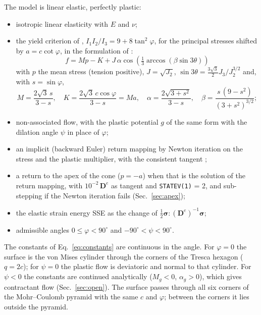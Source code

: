 \documentclass[11pt,a4paper]{article}
\begin{document}
The model is linear elastic, perfectly plastic:
\begin{itemize}
  \item isotropic linear elasticity with $E$ and $\nu$;
  \item the yield criterion of \citet{Matsuoka_1974}, $I_1 I_2 / I_3 = 9 + 8\tan^2\varphi$, for the
        principal stresses shifted by $a = c\cot\varphi$, in the formulation of
        \citet{Lagioia_2016}:
        \begin{equation}
          f = M p - K + J\,\alpha \cos\left(\tfrac{1}{3}\arccos(\beta\sin 3\theta)\right)
          \label{eq:f}
        \end{equation}
        with $p$ the mean stress (tension positive), $J = \sqrt{J_2}$,
        $\sin 3\theta = \tfrac{3\sqrt{3}}{2} J_3 / J_2^{3/2}$ and, with $s = \sin\varphi$,
        \begin{equation}
          M = \frac{2\sqrt{3}\,s}{3 - s},\quad
          K = \frac{2\sqrt{3}\,c\cos\varphi}{3 - s} = M a,\quad
          \alpha = \frac{2\sqrt{3 + s^2}}{3 - s},\quad
          \beta = \frac{s\,(9 - s^2)}{(3 + s^2)^{3/2}};
          \label{eq:constants}
        \end{equation}
  \item non-associated flow, with the plastic potential $g$ of the same form with the dilation
        angle $\psi$ in place of $\varphi$;
  \item an implicit (backward Euler) return mapping by Newton iteration on the stress and the
        plastic multiplier, with the consistent tangent \citep{Simo_1985, deSouzaNeto_2008};
  \item a return to the apex of the cone ($p = -a$) when that is the solution of the return
        mapping, with $10^{-2}\,\mathbf{D}^e$ as tangent and \texttt{STATEV(1)} = 2, and
        sub-stepping if the Newton iteration fails (Sec.~\ref{sec:apex});
  \item the elastic strain energy SSE as the change of
        $\frac{1}{2}\boldsymbol{\sigma} : (\mathbf{D}^e)^{-1}\boldsymbol{\sigma}$;
  \item admissible angles $0 \le \varphi < 90^\circ$ and $-90^\circ < \psi < 90^\circ$.
\end{itemize}
The constants of Eq.~\eqref{eq:constants} are continuous in the angle. For $\varphi = 0$ the surface
is the von Mises cylinder through the corners of the Tresca hexagon ($q = 2c$); for $\psi = 0$ the
plastic flow is deviatoric and normal to that cylinder. For $\psi < 0$ the constants are continued
analytically ($M_g < 0$, $\alpha_g > 0$), which gives contractant flow (Sec.~\ref{sec:open}).
The surface passes through all six corners of the Mohr--Coulomb pyramid with the same $c$ and
$\varphi$; between the corners it lies outside the pyramid.
\end{document}
